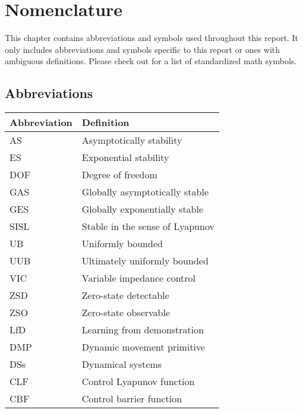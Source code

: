 \chapter*{Nomenclature}

This chapter contains abbreviations and symbols used throughout this report. It only includes abbreviations and symbols specific to this report or ones with ambiguous definitions. Please check out \cite{ListMathematicalSymbols2022} for a list of standardized math symbols.

\section*{Abbreviations}

\begin{longtable}{p{2.5cm}p{8cm}}
    \toprule
    Abbreviation & Definition                      \\
    \midrule\endhead %
    AS           & Asymptotically stability        \\
    ES           & Exponential stability           \\
    DOF          & Degree of freedom               \\
    GAS          & Globally asymptotically stable  \\
    GES          & Globally exponentially  stable  \\
    SISL         & Stable in the sense of Lyapunov \\
    UB           & Uniformly bounded               \\
    UUB          & Ultimately uniformly bounded    \\
    VIC          & Variable impedance control      \\
    ZSD          & Zero-state detectable           \\
    ZSO          & Zero-state observable           \\
    LfD          & Learning from demonstration     \\
    DMP          & Dynamic movement primitive      \\
    DSs          & Dynamical systems               \\
    CLF          & Control Lyapunov function       \\
    CBF          & Control barrier function        \\
    \bottomrule
\end{longtable}

